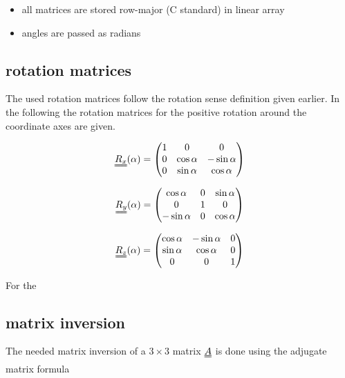 \begin{itemize}
 \item all matrices are stored row-major (C standard) in linear array
 \item angles are passed as radians
\end{itemize}

\subsection*{rotation matrices}

The used rotation matrices follow the rotation sense definition given earlier. In the following the rotation matrices for the positive rotation around the coordinate axes are given.

\begin{align}
\mat {R_x} ( \alpha ) = \begin{pmatrix}
                       1 & 0 & 0 \\
               0 & \cos\alpha & -\sin\alpha \\
               0 & \sin\alpha & \cos\alpha
                      \end{pmatrix}
\end{align}

\begin{align}
\mat {R_y} ( \alpha ) = \begin{pmatrix}
                       \cos\alpha & 0 & \sin\alpha \\
               0 & 1 & 0 \\
               -\sin\alpha & 0 & \cos\alpha
                      \end{pmatrix}
\end{align}

\begin{align}
\mat {R_z} ( \alpha ) = \begin{pmatrix}
               \cos\alpha & -\sin\alpha & 0 \\
               \sin\alpha & \cos\alpha  & 0 \\
               0 & 0 & 1
                      \end{pmatrix}
\end{align}

For the

\subsection*{matrix inversion}
The needed matrix inversion of a $3\times3$ matrix $\mat A$ is done using the adjugate matrix formula

